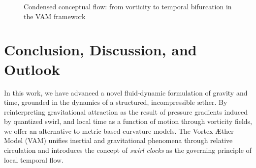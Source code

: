 \documentclass[a4paper,12pt]{article}
\begin{document}
    \begin{figure}[h]
        \centering
        \caption{Condensed conceptual flow: from vorticity to temporal bifurcation in the VAM framework}
    \end{figure}

    \section{Conclusion, Discussion, and Outlook}

    In this work, we have advanced a novel fluid-dynamic formulation of gravity and time, grounded in the dynamics of a structured, incompressible æther. By reinterpreting gravitational attraction as the result of pressure gradients induced by quantized swirl, and local time as a function of motion through vorticity fields, we offer an alternative to metric-based curvature models. The Vortex Æther Model (VAM) unifies inertial and gravitational phenomena through relative circulation and introduces the concept of \emph{swirl clocks} as the governing principle of local temporal flow.
\end{document}
